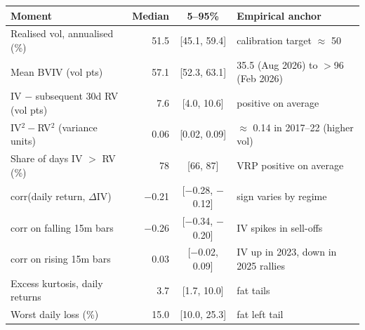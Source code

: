 \begin{tabular}{@{}lrcl@{}}
\toprule
Moment & Median & 5--95\% & Empirical anchor \\
\midrule
Realised vol, annualised (\%) & 51.5 & [45.1, 59.4] & calibration target $\approx$ 50 \\
Mean BVIV (vol pts) & 57.1 & [52.3, 63.1] & 35.5 (Aug 2026) to $>$96 (Feb 2026) \\
IV $-$ subsequent 30d RV (vol pts) & 7.6 & [4.0, 10.6] & positive on average \\
IV$^2-$RV$^2$ (variance units) & 0.06 & [0.02, 0.09] & $\approx$ 0.14 in 2017--22 (higher vol) \\
Share of days IV $>$ RV (\%) & 78 & [66, 87] & VRP positive on average \\
corr(daily return, $\Delta$IV) & \ensuremath{-}0.21 & [\ensuremath{-}0.28, \ensuremath{-}0.12] & sign varies by regime \\
corr on falling 15m bars & \ensuremath{-}0.26 & [\ensuremath{-}0.34, \ensuremath{-}0.20] & IV spikes in sell-offs \\
corr on rising 15m bars & 0.03 & [\ensuremath{-}0.02, 0.09] & IV up in 2023, down in 2025 rallies \\
Excess kurtosis, daily returns & 3.7 & [1.7, 10.0] & fat tails \\
Worst daily loss (\%) & 15.0 & [10.0, 25.3] & fat left tail \\
\bottomrule
\end{tabular}
